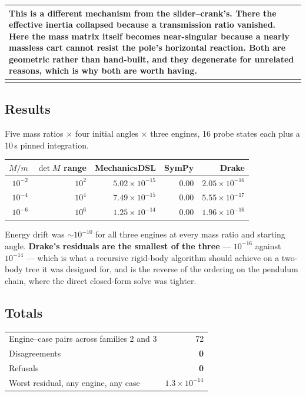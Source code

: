 \documentclass[11pt,a4paper]{article}
\makeatletter
\newenvironment{callout}
  {\par\medskip\noindent\begin{tabular}{@{}p{0.94\textwidth}@{}}
   \arrayrulecolor{warnrule}\hline\rule{0pt}{2.6ex}}
  {\\[0.8ex]\hline\arrayrulecolor{black}\end{tabular}\par\medskip}
\makeatother
\begin{document}
\begin{callout}
This is a different mechanism from the slider--crank's. There the effective
inertia collapsed because a transmission ratio vanished. Here the mass matrix
itself becomes near-singular because a nearly massless cart cannot resist the
pole's horizontal reaction. Both are geometric rather than hand-built, and they
degenerate for unrelated reasons, which is why both are worth having.
\end{callout}

\subsection{Results}

Five mass ratios $\times$ four initial angles $\times$ three engines, 16 probe
states each plus a 10\,s pinned integration.

\begin{center}
\begin{tabular}{@{}rrrrr@{}}
\toprule
$M/m$ & $\det M$ range & \textbf{MechanicsDSL} & \textbf{SymPy} & \textbf{Drake} \\
\midrule
$10^{-2}$ & $10^{2}$ & $5.02\times10^{-15}$ & $0.00$ & $2.05\times10^{-16}$ \\
$10^{-4}$ & $10^{4}$ & $7.49\times10^{-15}$ & $0.00$ & $5.55\times10^{-17}$ \\
$10^{-6}$ & $10^{6}$ & $1.25\times10^{-14}$ & $0.00$ & $1.96\times10^{-16}$ \\
\bottomrule
\end{tabular}
\end{center}

\noindent Energy drift was $\sim10^{-10}$ for all three engines at every mass
ratio and starting angle. \textbf{Drake's residuals are the smallest of the
three} --- $10^{-16}$ against $10^{-14}$ --- which is what a recursive
rigid-body algorithm should achieve on a two-body tree it was designed for, and
is the reverse of the ordering on the pendulum chain, where the direct
closed-form solve was tighter.

\subsection{Totals}

\begin{center}
\begin{tabular}{@{}lr@{}}
\toprule
Engine--case pairs across families 2 and 3 & 72 \\
Disagreements & \textbf{0} \\
Refusals      & \textbf{0} \\
Worst residual, any engine, any case & $1.3\times10^{-14}$ \\
\bottomrule
\end{tabular}
\end{center}
\end{document}
